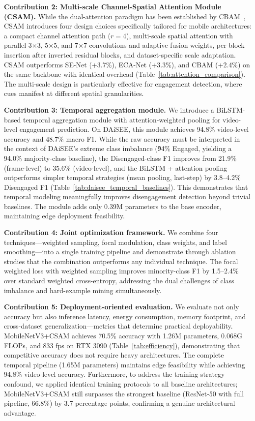 \documentclass[sensors,article,submit,pdftex,moreauthors]{Definitions/mdpi}
\begin{document}
\textbf{Contribution 2: Multi-scale Channel-Spatial Attention Module (CSAM).}
While the dual-attention paradigm has been established by CBAM~\cite{woo2018cbam}, CSAM introduces four design choices specifically tailored for mobile architectures: a compact channel attention path ($r=4$), multi-scale spatial attention with parallel 3$\times$3, 5$\times$5, and 7$\times$7 convolutions and adaptive fusion weights, per-block insertion after inverted residual blocks, and dataset-specific scale adaptation. CSAM outperforms SE-Net (+3.7\%), ECA-Net (+3.3\%), and CBAM (+2.4\%) on the same backbone with identical overhead (Table~\ref{tab:attention_comparison}). The multi-scale design is particularly effective for engagement detection, where cues manifest at different spatial granularities.

\textbf{Contribution 3: Temporal aggregation module.}
We introduce a BiLSTM-based temporal aggregation module with attention-weighted pooling for video-level engagement prediction. On DAiSEE, this module achieves 94.8\% video-level accuracy and 48.7\% macro F1. While the raw accuracy must be interpreted in the context of DAiSEE's extreme class imbalance (\~94\% Engaged, yielding a 94.0\% majority-class baseline), the Disengaged-class F1 improves from 21.9\% (frame-level) to 35.6\% (video-level), and the BiLSTM + attention pooling outperforms simpler temporal strategies (mean pooling, last-step) by 3.8--4.2\% Disengaged F1 (Table~\ref{tab:daisee_temporal_baselines}). This demonstrates that temporal modeling meaningfully improves disengagement detection beyond trivial baselines. The module adds only 0.39M parameters to the base encoder, maintaining edge deployment feasibility.

\textbf{Contribution 4: Joint optimization framework.}
We combine four techniques---weighted sampling, focal modulation, class weights, and label smoothing---into a single training pipeline and demonstrate through ablation studies that the combination outperforms any individual technique. The focal weighted loss with weighted sampling improves minority-class F1 by 1.5--2.4\% over standard weighted cross-entropy, addressing the dual challenges of class imbalance and hard-example mining simultaneously.

\textbf{Contribution 5: Deployment-oriented evaluation.}
We evaluate not only accuracy but also inference latency, energy consumption, memory footprint, and cross-dataset generalization---metrics that determine practical deployability. MobileNetV3+CSAM achieves 70.5\% accuracy with 1.26M parameters, 0.068G FLOPs, and 833 fps on RTX 3090 (Table~\ref{tab:efficiency}), demonstrating that competitive accuracy does not require heavy architectures. The complete temporal pipeline (1.65M parameters) maintains edge feasibility while achieving 94.8\% video-level accuracy. Furthermore, to address the training strategy confound, we applied identical training protocols to all baseline architectures; MobileNetV3+CSAM still surpasses the strongest baseline (ResNet-50 with full pipeline, 66.8\%) by 3.7 percentage points, confirming a genuine architectural advantage.
\end{document}
